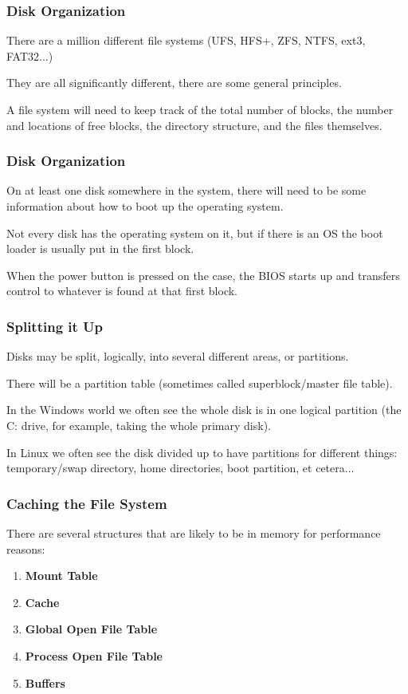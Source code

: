 \begin{frame}
\frametitle{Disk Organization}

There are a million different file systems (UFS, HFS+, ZFS, NTFS, ext3, FAT32...) 

They are all significantly different, there are some general principles. 

A file system will need to keep track of the total number of blocks, the number and locations of free blocks, the directory structure, and the files themselves.

\end{frame}

\begin{frame}
\frametitle{Disk Organization}

On at least one disk somewhere in the system, there will need to be some information about how to boot up the operating system. 

Not every disk has the operating system on it, but if there is an OS the boot loader is usually put in the first block. 

When the power button is pressed on the case, the BIOS starts up and transfers control to whatever is found at that first block.

\end{frame}

\begin{frame}
\frametitle{Splitting it Up}
Disks may be split, logically, into several different areas, or \alert{partitions}. 

There will be a partition table (sometimes called superblock/master file table).


In the Windows world we often see the whole disk is in one logical partition (the C: drive, for example, taking the whole primary disk). 

In Linux we often see the disk divided up to have partitions for different things: temporary/swap directory, home directories, boot partition, et cetera...

\end{frame}

\begin{frame}
\frametitle{Caching the File System}

There are several structures that are likely to be in memory for performance reasons:

\begin{enumerate}
	\item \textbf{Mount Table}
	\item \textbf{Cache}
	\item \textbf{Global Open File Table}
	\item \textbf{Process Open File Table}
	\item \textbf{Buffers}
\end{enumerate}

\end{frame}

